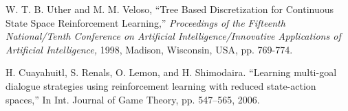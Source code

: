 \documentclass[journal]{IEEEtran}
\begin{document}
\begin{thebibliography}{1}
W. T. B. Uther and M. M. Veloso, ``Tree Based Discretization for Continuous State Space Reinforcement Learning,'' \emph{Proceedings of the Fifteenth National/Tenth Conference on Artificial Intelligence/Innovative Applications of Artificial Intelligence,} 1998, Madison, Wisconsin, USA, pp. 769-774.

H. Cuayahuitl, S. Renals, O. Lemon, and H. Shimodaira. ``Learning multi-goal dialogue strategies using reinforcement learning with reduced state-action spaces,'' In Int. Journal of Game Theory, pp. 547–565, 2006.

\end{thebibliography}


\end{document}
